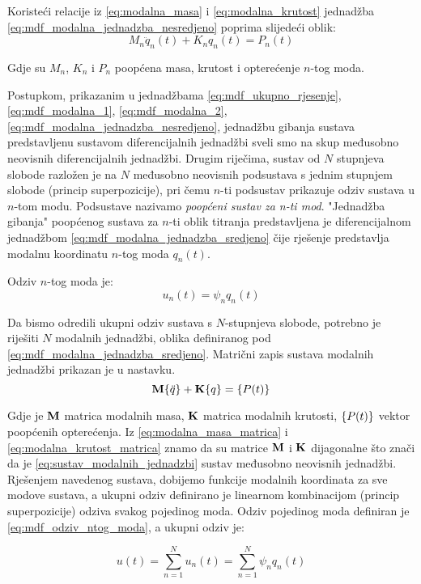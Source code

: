 Koristeći relacije iz \eqref{eq:modalna_masa} i \eqref{eq:modalna_krutost} jednadžba
\eqref{eq:mdf_modalna_jednadzba_nesredjeno} poprima slijedeći oblik:
\begin{equation}\label{eq:mdf_modalna_jednadzba_sredjeno}
    M_n\ddot{q}_n(t)+K_nq_n(t)=P_n(t)
\end{equation}

Gdje su $M_n$, $K_n$ i $P_n$ poopćena masa, krutost i opterećenje $n$-tog moda.

Postupkom, prikazanim u jednadžbama \eqref{eq:mdf_ukupno_rjesenje},
\eqref{eq:mdf_modalna_1}, \eqref{eq:mdf_modalna_2},
\eqref{eq:mdf_modalna_jednadzba_nesredjeno}, jednadžbu gibanja sustava predstavljenu
sustavom diferencijalnih jednadžbi sveli smo na skup međusobno neovisnih
diferencijalnih jednadžbi. Drugim riječima, sustav od $N$ stupnjeva slobode razložen
je na $N$ međusobno neovisnih podsustava s jednim stupnjem slobode (princip superpozicije), 
pri čemu $n$-ti podsustav prikazuje odziv sustava u $n$-tom modu. Podsustave 
nazivamo \textit{poopćeni sustav za n-ti mod}. "Jednadžba gibanja" 
poopćenog sustava za $n$-ti oblik titranja predstavljena je diferencijalnom jednadžbom
\eqref{eq:mdf_modalna_jednadzba_sredjeno} čije rješenje predstavlja modalnu 
koordinatu $n$-tog moda $q_n(t)$.
\par

Odziv $n$-tog moda je:
\begin{equation}\label{eq:mdf_odziv_ntog_moda}
    u_n(t)=\psi_nq_n(t)
\end{equation}

Da bismo odredili ukupni odziv sustava s $N$-stupnjeva slobode, potrebno je riješiti
$N$ modalnih jednadžbi, oblika definiranog pod \eqref{eq:mdf_modalna_jednadzba_sredjeno}.
Matrični zapis sustava modalnih jednadžbi prikazan je u nastavku.
\begin{equation}\label{eq:sustav_modalnih_jednadzbi}
    \M\vtor{q}{:} + \K\vtor{q}{}=\vtor{P(t)}{}
\end{equation}

Gdje je $\mathbf{M}$ matrica modalnih masa, $\mathbf{K}$ matrica modalnih krutosti, $\vtor{P(t)}{}$
vektor poopćenih opterećenja. Iz \eqref{eq:modalna_masa_matrica} i
\eqref{eq:modalna_krutost_matrica} znamo da su matrice $\mathbf{M}$ i $\mathbf{K}$ dijagonalne što
znači da je \eqref{eq:sustav_modalnih_jednadzbi} sustav međusobno neovisnih jednadžbi.
Rješenjem navedenog sustava, dobijemo funkcije modalnih koordinata za sve modove
sustava, a ukupni odziv definirano je linearnom kombinacijom (princip superpozicije) 
odziva svakog pojedinog moda. Odziv pojedinog moda definiran je
\eqref{eq:mdf_odziv_ntog_moda}, a ukupni odziv je:

\begin{equation}\label{eq:mdf_modalna_ukupno_rjesenje}
    u(t)=\sum_{n=1}^Nu_n(t)=\sum_{n=1}^N\psi_nq_n(t)
\end{equation}
